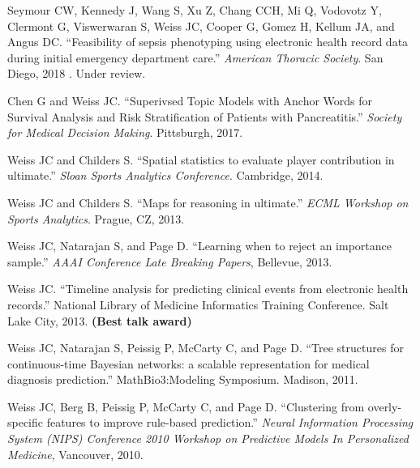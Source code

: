 \begin{bibsection}

\item  Seymour CW, Kennedy J, Wang S, Xu Z, Chang CCH, Mi Q, Vodovotz Y, Clermont G, Viswerwaran S, Weiss JC, Cooper G, Gomez H, Kellum JA, and Angus DC. ``Feasibility of sepsis phenotyping using electronic health record data during initial emergency department care.'' \textit{American Thoracic Society}. San Diego, 2018 . Under review.
  
\item  Chen G and Weiss JC. ``Superivsed Topic Models with Anchor Words for Survival Analysis and Risk Stratification of Patients with Pancreatitis.'' \textit{Society for Medical Decision Making}. Pittsburgh, 2017.
  
\item  Weiss JC and Childers S. ``Spatial statistics to evaluate player contribution in ultimate.'' \textit{Sloan Sports Analytics Conference}. Cambridge, 2014.

\item  Weiss JC and Childers S. ``Maps for reasoning in ultimate.'' \textit{ECML Workshop on Sports Analytics}. Prague, CZ, 2013.

\item  Weiss JC, Natarajan S, and Page D. ``Learning when to reject an importance sample.'' \textit{AAAI Conference Late Breaking Papers}, Bellevue, 2013.

\item  Weiss JC. ``Timeline analysis for predicting clinical events from electronic health records.'' National Library of Medicine Informatics Training Conference. Salt Lake City, 2013. \textbf{(Best talk award)}

\item  Weiss JC, Natarajan S, Peissig P, McCarty C, and Page D. ``Tree structures for continuous-time Bayesian networks: a scalable representation for medical diagnosis prediction.'' MathBio3:Modeling Symposium. Madison, 2011.

\item  Weiss JC, Berg B, Peissig P, McCarty C, and Page D. ``Clustering from overly-specific features to improve rule-based prediction.'' \textit{Neural Information Processing System (NIPS) Conference 2010 Workshop on Predictive Models In Personalized Medicine}, Vancouver, 2010.
 
\end{bibsection}



